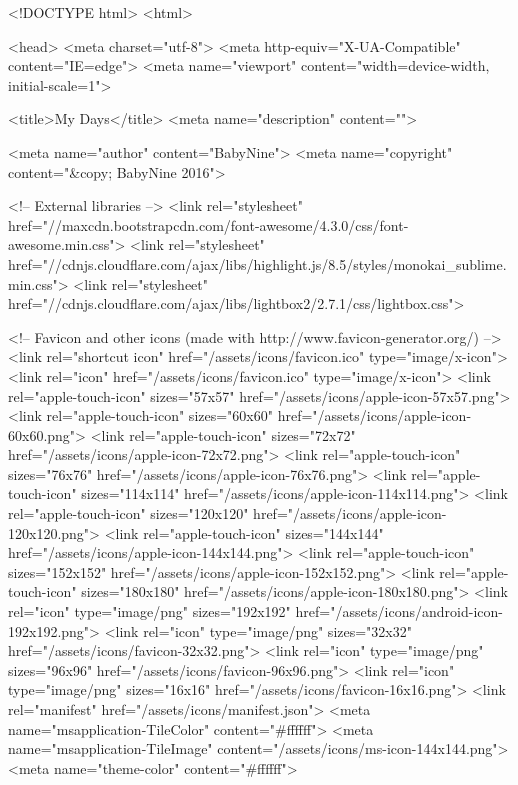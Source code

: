 <!DOCTYPE html>
<html>

  <head>
  <meta charset="utf-8">
  <meta http-equiv="X-UA-Compatible" content="IE=edge">
  <meta name="viewport" content="width=device-width, initial-scale=1">

  <title>My Days</title>
  <meta name="description" content="">
  
  <meta name="author" content="BabyNine">
  <meta name="copyright" content="&copy; BabyNine 2016">
  

  <!-- External libraries -->
  <link rel="stylesheet" href="//maxcdn.bootstrapcdn.com/font-awesome/4.3.0/css/font-awesome.min.css">
  <link rel="stylesheet" href="//cdnjs.cloudflare.com/ajax/libs/highlight.js/8.5/styles/monokai_sublime.min.css">
  <link rel="stylesheet" href="//cdnjs.cloudflare.com/ajax/libs/lightbox2/2.7.1/css/lightbox.css">

  <!-- Favicon and other icons (made with http://www.favicon-generator.org/) -->
  <link rel="shortcut icon" href="/assets/icons/favicon.ico" type="image/x-icon">
  <link rel="icon" href="/assets/icons/favicon.ico" type="image/x-icon">
  <link rel="apple-touch-icon" sizes="57x57" href="/assets/icons/apple-icon-57x57.png">
  <link rel="apple-touch-icon" sizes="60x60" href="/assets/icons/apple-icon-60x60.png">
  <link rel="apple-touch-icon" sizes="72x72" href="/assets/icons/apple-icon-72x72.png">
  <link rel="apple-touch-icon" sizes="76x76" href="/assets/icons/apple-icon-76x76.png">
  <link rel="apple-touch-icon" sizes="114x114" href="/assets/icons/apple-icon-114x114.png">
  <link rel="apple-touch-icon" sizes="120x120" href="/assets/icons/apple-icon-120x120.png">
  <link rel="apple-touch-icon" sizes="144x144" href="/assets/icons/apple-icon-144x144.png">
  <link rel="apple-touch-icon" sizes="152x152" href="/assets/icons/apple-icon-152x152.png">
  <link rel="apple-touch-icon" sizes="180x180" href="/assets/icons/apple-icon-180x180.png">
  <link rel="icon" type="image/png" sizes="192x192"  href="/assets/icons/android-icon-192x192.png">
  <link rel="icon" type="image/png" sizes="32x32" href="/assets/icons/favicon-32x32.png">
  <link rel="icon" type="image/png" sizes="96x96" href="/assets/icons/favicon-96x96.png">
  <link rel="icon" type="image/png" sizes="16x16" href="/assets/icons/favicon-16x16.png">
  <link rel="manifest" href="/assets/icons/manifest.json">
  <meta name="msapplication-TileColor" content="#ffffff">
  <meta name="msapplication-TileImage" content="/assets/icons/ms-icon-144x144.png">
  <meta name="theme-color" content="#ffffff">

